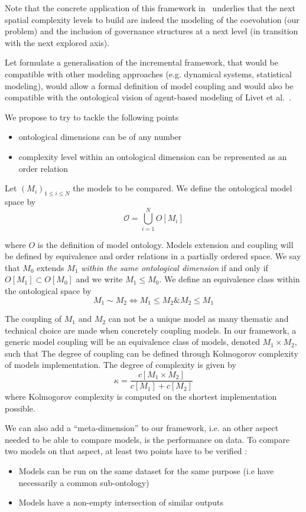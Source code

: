 Note that the concrete application of this framework in~\cite{cottineau2014evolution} underlies that the next spatial complexity levels to build are indeed the modeling of the coevolution (our problem) and the inclusion of governance structures at a next level (in transition with the next explored axis).

Let formulate a generalisation of the incremental framework, that would be compatible with other modeling approaches (e.g. dynamical systems, statistical modeling), would allow a formal definition of model coupling and would also be compatible with the ontological vision of agent-based modeling of Livet et al.~\cite{livet2010}.

We propose to try to tackle the following points
\begin{itemize}
\item ontological dimensions can be of any number
\item complexity level within an ontological dimension can be represented as an order relation
\end{itemize}


Let $(M_i)_{1\leq i \leq N}$ the models to be compared. We define the ontological model space by
\[
\mathcal{O} = \bigcup_{i=1}^{N} O[M_i]
\]

where $O$ is the definition of model ontology.
Models extension and coupling will be defined by equivalence and order relations in a partially ordered space. We say that $M_0$ extends $M_1$ \emph{within the same ontological dimension} if and only if $O[M_1] \subset O[M_0]$ and we write $M_1 \leq M_0 $. We define an equivalence class within the ontological space by
\[
M_1 \sim M_2 \iff M_1 \leq M_2 \& M_2 \leq M_1  
\]


The coupling of $M_1$ and $M_2$ can not be a unique model as many thematic and technical choice are made when concretely coupling models. In our framework, a generic model coupling will be an equivalence class of models, denoted $M_1 \times M_2$, such that 
The degree of coupling can be defined through Kolmogorov complexity of models implementation. The degree of complexity is given by
\[
\kappa = \frac{c[M_1 \times M_2]}{c[M_1] + c[M_2]}
\]
where Kolmogorov complexity is computed on the shortest implementation possible.


We can also add a ``meta-dimension'' to our framework, i.e. an other aspect needed to be able to compare models, is the performance on data. To compare two models on that aspect, at least two points have to be verified :
\begin{itemize}
\item Models can be run on the same dataset for the same purpose (i.e have necessarily a common sub-ontology)
\item Models have a non-empty intersection of similar outputs
\end{itemize}



